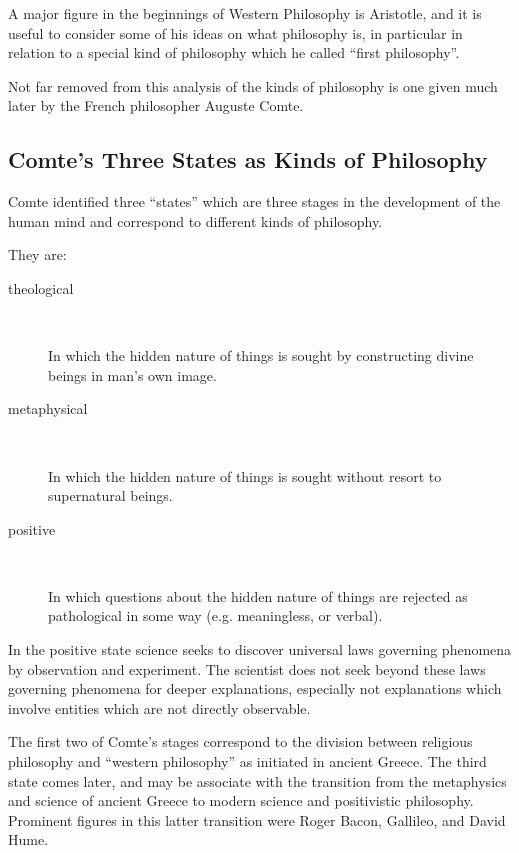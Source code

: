 \documentclass[10pt,titlepage]{article}
\begin{document}
A major figure in the beginnings of Western Philosophy is Aristotle, and it is useful to consider some of his ideas on what philosophy is, in particular in relation to a special kind of philosophy which he called ``first philosophy''.

Not far removed from this analysis of the kinds of philosophy is one given much later by the French philosopher Auguste Comte.

\subsection{Comte's Three States as Kinds of Philosophy}

Comte identified three ``states'' which are three stages in the development of the human mind and correspond to different kinds of philosophy.

They are:

\begin{center}
\begin{description}
\item[theological] \ 

    In which the hidden nature of things is sought by constructing divine beings in man's own image.

\item[metaphysical] \ 

    In which the hidden nature of things is sought without resort to supernatural beings.

\item[positive] \ 

    In which questions about the hidden nature of things are rejected as pathological in some way (e.g. meaningless, or verbal).
\end{description}
\end{center}

    In the positive state science seeks to discover universal laws governing phenomena by observation and experiment. The scientist does not seek beyond these laws governing phenomena for deeper explanations, especially not explanations which involve entities which are not directly observable.

The first two of Comte's stages correspond to the division between religious philosophy and ``western philosophy'' as initiated in ancient Greece.
The third state comes later, and may be associate with the transition from the metaphysics and science of ancient Greece to modern science and positivistic philosophy.
Prominent figures in this latter transition were Roger Bacon, Gallileo, and David Hume.
\end{document}
